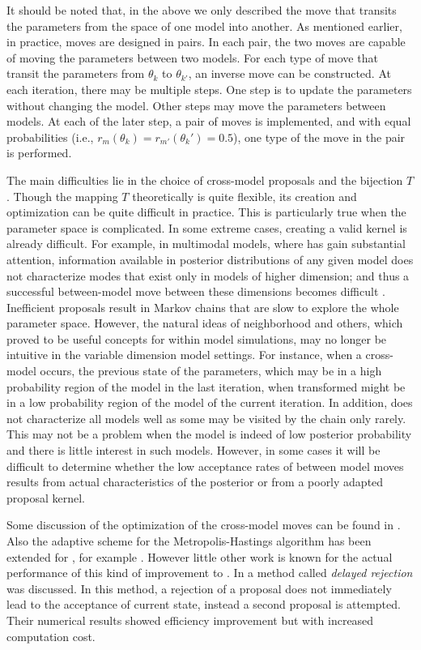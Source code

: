 It should be noted that, in the above we only described the move that transits the parameters from the space of one model into another. As mentioned earlier, in practice, \rjmcmc moves are designed in pairs. In each pair, the two moves are capable of moving the parameters between two models. For each type of move that transit the parameters from $\theta_k$ to $\theta_{k'}$, an inverse move can be constructed. At each iteration, there may be multiple steps. One step is to update the parameters without changing the model. Other steps may move the parameters between models. At each of the later step, a pair of moves is implemented, and with equal probabilities (i.e., $r_m(\theta_k) = r_{m'}(\theta_k') = 0.5$), one type of the move in the pair is performed.

The main difficulties lie in the choice of cross-model proposals and the bijection $T$. Though the mapping $T$ theoretically is quite flexible, its creation and optimization can be quite difficult in practice. This is particularly true when the parameter space is complicated. In some extreme cases, creating a valid kernel is already difficult. For example, in multimodal models, where \rjmcmc has gain substantial attention, information available in posterior distributions of any given model does not characterize modes that exist only in models of higher dimension; and thus a successful between-model move between these dimensions becomes difficult \cite{Jasra:2007id}. Inefficient proposals result in Markov chains that are slow to explore the whole parameter space. However, the natural ideas of neighborhood and others, which proved to be useful concepts for within model simulations, may no longer be intuitive in the variable dimension model settings. For instance, when a cross-model occurs, the previous state of the parameters, which may be in a high probability region of the model in the last iteration, when transformed might be in a low probability region of the model of the current iteration. In addition, \rjmcmc does not characterize all models well as some may be visited by the chain only rarely. This may not be a problem when the model is indeed of low posterior probability and there is little interest in such models. However, in some cases it will be difficult to determine whether the low acceptance rates of between model moves results from actual characteristics of the posterior or from a poorly adapted proposal kernel.

Some discussion of the optimization of the cross-model moves can be found in \cite{Green:2009tr}. Also the adaptive scheme for the Metropolis-Hastings algorithm has been extended for \rjmcmc, for example \cite{Hastie:2005vi}. However little other work is known for the actual performance of this kind of improvement to \rjmcmc. In \cite{Green:2001tk} a method called \emph{delayed rejection} was discussed. In this method, a rejection of a proposal does not immediately lead to the acceptance of current state, instead a second proposal is attempted. Their numerical results showed efficiency improvement but with increased computation cost.

